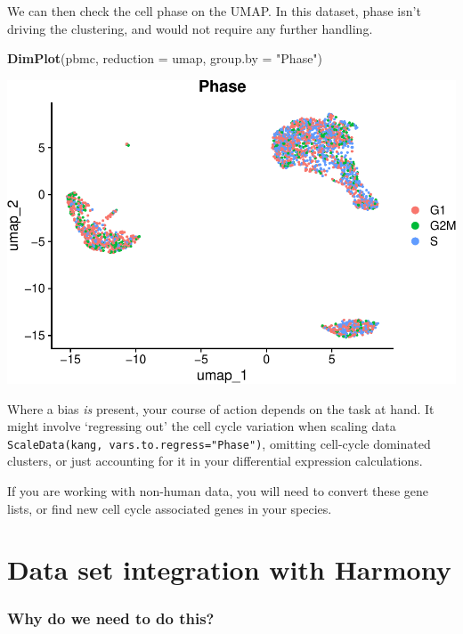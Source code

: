 \documentclass[
]{book}
\newenvironment{Shaded}{\begin{snugshade}}{\end{snugshade}}
\newcommand{\AttributeTok}[1]{\textcolor[rgb]{0.13,0.29,0.53}{#1}}
\newcommand{\FunctionTok}[1]{\textcolor[rgb]{0.13,0.29,0.53}{\textbf{#1}}}
\newcommand{\NormalTok}[1]{#1}
\newcommand{\StringTok}[1]{\textcolor[rgb]{0.31,0.60,0.02}{#1}}
\begin{document}
We can then check the cell phase on the UMAP. In this dataset, phase isn't driving the clustering, and would not require any further handling.

\begin{Shaded}
\begin{Highlighting}[]
\FunctionTok{DimPlot}\NormalTok{(pbmc, }\AttributeTok{reduction =} \StringTok{\textquotesingle{}umap\textquotesingle{}}\NormalTok{, }\AttributeTok{group.by =} \StringTok{"Phase"}\NormalTok{)}
\end{Highlighting}
\end{Shaded}

\includegraphics{scRNAseqInR_Doco_files/figure-latex/unnamed-chunk-64-1.pdf}

Where a bias \emph{is} present, your course of action depends on the task at hand. It might involve `regressing out' the cell cycle variation when scaling data \texttt{ScaleData(kang,\ vars.to.regress="Phase")}, omitting cell-cycle dominated clusters, or just accounting for it in your differential expression calculations.

If you are working with non-human data, you will need to convert these gene lists, or find new cell cycle associated genes in your species.

\chapter{Data set integration with Harmony}\label{Harmony}

\subsection*{Why do we need to do this?}\label{why-do-we-need-to-do-this-8}
\end{document}
